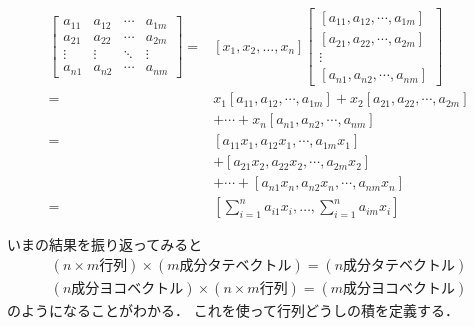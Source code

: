 \documentclass[11pt, a4paper, dvipdfmx]{jsarticle}
\theoremstyle{definition}
\theoremstyle{mystyle}
\numberwithin{equation}{section} %
\begin{document}
\begin{align*}
    [x_1,x_2,\dots,x_n]\begin{bmatrix}
        a_{11}&a_{12}&\cdots&a_{1m}\\
        a_{21}&a_{22}&\cdots&a_{2m}\\
        \vdots&\vdots&\ddots&\vdots\\
        a_{n1}&a_{n2}&\cdots&a_{nm}
    \end{bmatrix}
    =&[x_1,x_2,\dots,x_n]\begin{bmatrix}
        [a_{11},a_{12},\cdots,a_{1m}]\\
        [a_{21},a_{22},\cdots,a_{2m}]\\
        \vdots\\
        [a_{n1},a_{n2},\cdots,a_{nm}]
    \end{bmatrix}\\
    =&x_1[a_{11},a_{12},\cdots,a_{1m}]
    +x_2[a_{21},a_{22},\cdots,a_{2m}]\\
    &+\cdots+x_n[a_{n1},a_{n2},\cdots,a_{nm}]\\
    =&[a_{11}x_1,a_{12}x_1,\cdots,a_{1m}x_1]\\
    &+[a_{21}x_2,a_{22}x_2,\cdots,a_{2m}x_2]\\
    &+\cdots
    +[a_{n1}x_n,a_{n2}x_n,\cdots,a_{nm}x_n]\\
    =&\left[\sum_{i=1}^{n}a_{i1}x_i,\dots,
    \sum_{i=1}^{n}a_{im}x_i\right]
\end{align*}

いまの結果を振り返ってみると
\begin{align*}
    (n\times m\text{行列})\times(m\text{成分タテベクトル})=(n\text{成分タテベクトル})\\
    (n\text{成分ヨコベクトル})\times(n\times m\text{行列})=(m\text{成分ヨコベクトル})
\end{align*}
のようになることがわかる．
これを使って行列どうしの積を定義する．
\end{document}
